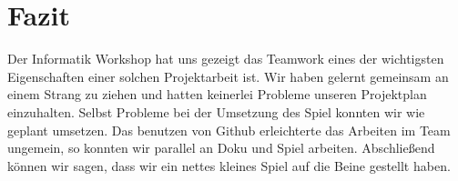 \chapter{Fazit}
Der Informatik Workshop hat uns gezeigt das Teamwork eines der wichtigsten Eigenschaften einer solchen Projektarbeit ist. Wir haben gelernt gemeinsam an einem Strang zu ziehen und hatten keinerlei Probleme unseren Projektplan einzuhalten. Selbst Probleme bei der Umsetzung des Spiel konnten wir wie geplant umsetzen. Das benutzen von Github erleichterte das Arbeiten im Team ungemein, so konnten wir parallel an Doku und Spiel arbeiten. Abschließend können wir sagen, dass wir ein nettes kleines Spiel auf die Beine gestellt haben.